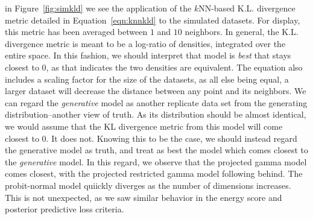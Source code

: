 in Figure~\ref{fig:simkld} we see the application of the $k$NN-based K.L. divergence metric detailed
  in Equation~\ref{eqn:knnkld} to the simulated datasets.  For display, this metric has been averaged
  between $1$ and $10$ neighbors.  In general, the K.L. divergence metric is meant to be a log-ratio
  of densities, integrated over the entire space.  In this fashion, we should interpret that model
  is \emph{best} that stays closest to 0, as that indicates the two densities are equivalent.  The
  equation also includes a scaling factor for the size of the datasets, as all else being equal, a
  larger dataset will decrease the distance between any point and its neighbors.  We can regard the
  \emph{generative} model as another replicate data set from the generating distribution--another
  view of truth.  As its distribution should be almost identical, we would assume that the KL divergence
  metric from this model will come closest to 0.  It does not.  Knowing this to be the case, we should
  instead regard the generative model as truth, and treat as best the model which comes closest to the
  \emph{generative} model.  In this regard, we observe that the projected gamma model comes closest,
  with the projected restricted gamma model following behind.  The probit-normal model quiickly diverges
  as the number of dimensions increases.  This is not unexpected, as we saw similar behavior in the
  energy score and posterior predictive loss criteria.




